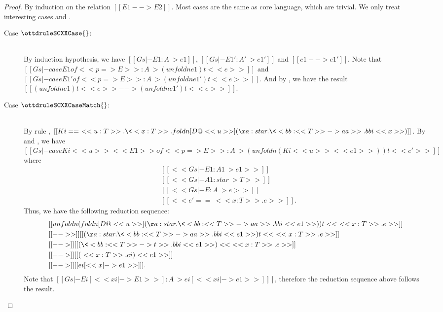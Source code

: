 \begin{proof}
    By induction on the relation $[[E1 --> E2]]$. Most cases are the same as core language, which are trivial. We only treat interesting cases  and .
    \begin{description}
        \item[Case \scriptsize{$\ottdruleSCXXCase{}$}:] $\quad$ \\
        By induction hypothesis, we have $[[Gs |- E1 : A ~> e1]]$, $[[Gs |- E1' : A' ~> e1']]$ and $[[e1 --> e1']]$. Note that $[[Gs |- case E1 of << p => E >> : A ~> (unfoldn e1) t <<e>>]]$ and $[[Gs |- case E1' of << p => E >> : A ~> (unfoldn e1') t <<e>>]]$. And by , we have the result $[[(unfoldn e1) t <<e>> --> (unfoldn e1') t <<e>>]]$.
        \item[Case \scriptsize{$\ottdruleSCXXCaseMatch{}$}:] $\quad$ \\
        By rule , $[[Ki == \ <<u:T>> . \<<x:T>> . foldn [D@<<u>>] (\aa:star.\<<bb : <<T>> -> aa >> . bbi <<x>>)]]$. By  and , we have $[[Gs |- case Ki <<u>> <<E1>> of <<p=>E>> : A ~> (unfoldn (Ki <<u>> <<e1>>)) t <<e'>>]]$ where
        \begin{align*}
                & [[<<Gs |- E1 : A1 ~> e1>>]] \\
                & [[<<Gs |- A1 : star ~> T>>]] \\
                & [[<<Gs |- E : A ~> e>>]] \\
                & [[<<e' == \ <<x:T>>.e >>]].
        \end{align*}
        Thus, we have the following reduction sequence:
        \begin{align*}
            &[[unfoldn (foldn [D@<<u>>] (\aa:star.\<<bb : <<T>> -> aa >> . bbi <<e1>>)) t <<\ <<x:T>>.e>>]] \\
            &[[-->>]]  [[(\aa:star.\<<bb : <<T>> -> aa >> . bbi <<e1>>) t <<\ <<x:T>>.e>>]] \\
            &[[-->]]  [[(\<<bb : <<T>> -> t >> . bbi <<e1>>) <<\ <<x:T>>.e>>]] \\
            &[[-->]]  [[(\ <<x:T>>.ei) <<e1>>]] \\
            &[[-->]]  [[ei [<<x |-> e1>>] ]].
        \end{align*}
        Note that $[[Gs |- Ei [ << xi |-> E1 >> ] : A ~> ei [ << xi |-> e1 >> ] ]]$, therefore the reduction sequence above follows the result.
    \end{description}
\end{proof}

